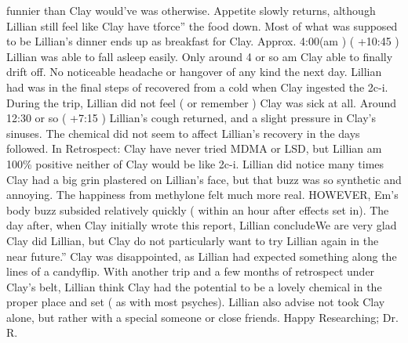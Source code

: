 \documentclass[12pt]{book}
\begin{document}
funnier than Clay would've was otherwise. Appetite slowly returns, although Lillian still feel like Clay have tforce'' the food down. Most of what was supposed to be Lillian's dinner ends up as breakfast for Clay. Approx. 4:00(am ) ( +10:45 ) Lillian was able to fall asleep easily. Only around 4 or so am Clay able to finally drift off. No noticeable headache or hangover of any kind the next day. Lillian had was in the final steps of recovered from a cold when Clay ingested the 2c-i. During the trip, Lillian did not feel ( or remember ) Clay was sick at all. Around 12:30 or so ( +7:15 ) Lillian's cough returned, and a slight pressure in Clay's sinuses. The chemical did not seem to affect Lillian's recovery in the days followed. In Retrospect: Clay have never tried MDMA or LSD, but Lillian am 100\% positive neither of Clay would be like 2c-i. Lillian did notice many times Clay had a big grin plastered on Lillian's face, but that buzz was so synthetic and annoying. The happiness from methylone felt much more real. HOWEVER, Em's body buzz subsided relatively quickly ( within an hour after effects set in). The day after, when Clay initially wrote this report, Lillian concludeWe are very glad Clay did Lillian, but Clay do not particularly want to try Lillian again in the near future.'' Clay was disappointed, as Lillian had expected something along the lines of a candyflip. With another trip and a few months of retrospect under Clay's belt, Lillian think Clay had the potential to be a lovely chemical in the proper place and set ( as with most psyches). Lillian also advise not took Clay alone, but rather with a special someone or close friends. Happy Researching; Dr. R.
\end{document}
